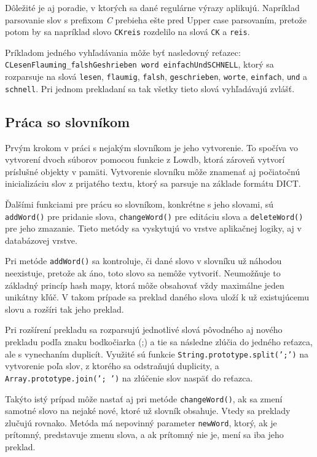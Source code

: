 \documentclass[
  digital, %
  table,   %
  lof,     %
  lot,     %
]{fithesis3}
\begin{document}
Dôležité je aj poradie, v ktorých sa dané regulárne výrazy aplikujú. Napríklad parsovanie slov s prefixom \textit{C} prebieha ešte pred Upper case parsovaním, pretože potom by sa napríklad slovo \texttt{CKreis} rozdelilo na slová \texttt{CK} a \texttt{reis}.

Príkladom jedného vyhľadávania môže byť nasledovný reťazec: \texttt{CLesenFlauming\_falshGeshrieben word einfachUndSCHNELL}, ktorý sa rozparsuje na slová \texttt{lesen}, \texttt{flaumig}, \texttt{falsh}, \texttt{geschrieben}, \texttt{worte}, \texttt{einfach}, \texttt{und} a \texttt{schnell}. Pri jednom prekladaní sa tak všetky tieto slová vyhľadávajú zvlášť.

\subsection{Práca so slovníkom}
Prvým krokom v práci s nejakým slovníkom je jeho vytvorenie. To spočíva vo vytvorení dvoch súborov pomocou funkcie z Lowdb, ktorá zároveň vytvorí príslušné objekty v pamäti. Vytvorenie slovníku môže znamenať aj počiatočnú inicializáciu slov z prijatého textu, ktorý sa parsuje na základe formátu DICT.

Ďalšími funkciami pre prácu so slovníkom, konkrétne s jeho slovami, sú \texttt{addWord()} pre pridanie slova, \texttt{changeWord()} pre editáciu slova a \texttt{deleteWord()} pre jeho zmazanie. Tieto metódy sa vyskytujú vo vrstve aplikačnej logiky, aj v databázovej vrstve.

Pri metóde \texttt{addWord()} sa kontroluje, či dané slovo v slovníku už náhodou neexistuje, pretože ak áno, toto slovo sa nemôže vytvoriť. Neumožňuje to základný princíp hash mapy, ktorá môže obsahovať vždy maximálne jeden unikátny kľúč. V takom prípade sa preklad daného slova uloží k už existujúcemu slovu a rozšíri tak jeho preklad.

Pri rozšírení prekladu sa rozparsujú jednotlivé slová pôvodného aj nového prekladu podľa znaku bodkočiarka (;) a tie sa následne zlúčia do jedného reťazca, ale s vynechaním duplicít. Využité sú funkcie \texttt{String.prototype.split(';')} na vytvorenie poľa slov, z ktorého sa odstraňujú duplicity, a \texttt{Array.prototype.join('; ')} na zlúčenie slov naspäť do reťazca.

Takýto istý prípad môže nastať aj pri metóde \texttt{changeWord()}, ak sa zmení samotné slovo na nejaké nové, ktoré už slovník obsahuje. Vtedy sa preklady zlučujú rovnako. Metóda má nepovinný parameter \texttt{newWord}, ktorý, ak je prítomný, predstavuje zmenu slova, a ak prítomný nie je, mení sa iba jeho preklad.
\end{document}
